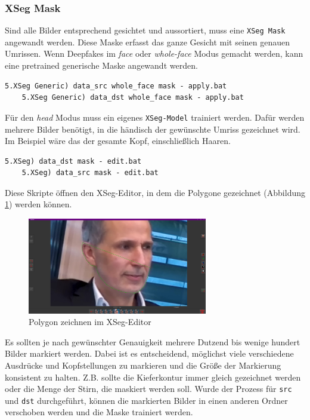 \subsubsection{XSeg Mask}
Sind alle Bilder entsprechend gesichtet und aussortiert, muss eine \texttt{XSeg Mask} angewandt werden.
Diese Maske erfasst das ganze Gesicht mit seinen genauen Umrissen.
Wenn Deepfakes im \textit{face} oder \textit{whole-face} Modus gemacht werden, kann eine pretrained generische Maske angewandt werden.
\begin{lstlisting}[label={lst:extraction-5},numbers=none]
    5.XSeg Generic) data_src whole_face mask - apply.bat
    5.XSeg Generic) data_dst whole_face mask - apply.bat
\end{lstlisting}
Für den \textit{head} Modus muss ein eigenes \texttt{XSeg-Model} trainiert werden.
Dafür werden mehrere Bilder benötigt, in die händisch der gewünschte Umriss gezeichnet wird.
Im Beispiel wäre das der gesamte Kopf, einschließlich Haaren.
\begin{lstlisting}[numbers=none,label={lst:extraction-6}]
    5.XSeg) data_dst mask - edit.bat
    5.XSeg) data_src mask - edit.bat
\end{lstlisting}
Diese Skripte öffnen den XSeg-Editor, in dem die Polygone gezeichnet (Abbildung \ref{fig:xseg-editor-1}) werden können.
\begin{figure}
    \center
    \includegraphics[width=0.7\textwidth]{Bilder/DFL/XSegEditor-1-draw}
    \caption{Polygon zeichnen im XSeg-Editor}
    \label{fig:xseg-editor-1}
\end{figure}
Es sollten je nach gewünschter Genauigkeit mehrere Dutzend bis wenige hundert Bilder markiert werden.
Dabei ist es entscheidend, möglichst viele verschiedene Ausdrücke und Kopfstellungen zu markieren und die Größe der Markierung konsistent zu halten.
Z.B. sollte die Kieferkontur immer gleich gezeichnet werden oder die Menge der Stirn, die maskiert werden soll.
Wurde der Prozess für \texttt{src} und \texttt{dst} durchgeführt, können die markierten Bilder in einen anderen Ordner verschoben werden und die Maske trainiert werden.
